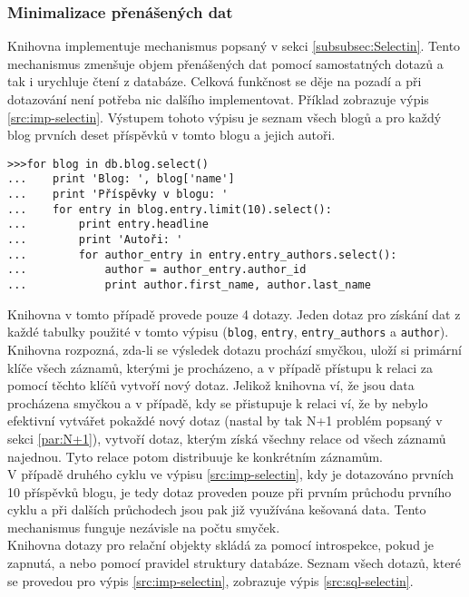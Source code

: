 \documentclass[ing,male,java,dept456]{diploma}						%
\begin{document}
\subsubsection{Minimalizace přenášených dat}

Knihovna implementuje mechanismus popsaný v sekci \ref{subsubsec:Selectin}. Tento mechanismus zmenšuje objem přenášených dat pomocí samostatných dotazů a tak i urychluje čtení z databáze. Celková funkčnost se děje na pozadí a při dotazování není potřeba nic dalšího implementovat. Příklad zobrazuje výpis \ref{src:imp-selectin}. Výstupem tohoto výpisu je seznam všech blogů a pro každý blog prvních deset příspěvků v tomto blogu a jejich autoři.

\begin{lstlisting}[style=custompython, label=src:imp-selectin, caption={Implementace samostatných dotazů v pypg}]
>>>for blog in db.blog.select()
...    print 'Blog: ', blog['name']
...    print 'Příspěvky v blogu: '
...    for entry in blog.entry.limit(10).select():
...        print entry.headline
...        print 'Autoři: '
...        for author_entry in entry.entry_authors.select():
...            author = author_entry.author_id
...            print author.first_name, author.last_name
\end{lstlisting}

Knihovna v tomto případě provede pouze 4 dotazy. Jeden dotaz pro získání dat z každé tabulky použité v tomto výpisu (\lstinline[style=inlinepython]|blog|, \lstinline[style=inlinepython]|entry|, \lstinline[style=inlinepython]|entry_authors| a \lstinline[style=inlinepython]|author|). \\
Knihovna rozpozná, zda-li se výsledek dotazu prochází smyčkou, uloží si primární klíče všech záznamů, kterými je procházeno, a v případě přístupu k relaci za pomocí těchto klíčů vytvoří nový dotaz. Jelikož knihovna ví, že jsou data procházena smyčkou a v případě, kdy se přistupuje k relaci ví, že by nebylo efektivní vytvářet pokaždé nový dotaz (nastal by tak N+1 problém popsaný v sekci \ref{par:N+1}), vytvoří dotaz, kterým získá všechny relace od všech záznamů najednou. Tyto relace potom distribuuje ke konkrétním záznamům. \\
V případě druhého cyklu ve výpisu \ref{src:imp-selectin}, kdy je dotazováno prvních 10 příspěvků blogu, je tedy dotaz proveden pouze při prvním průchodu prvního cyklu a při dalších průchodech jsou pak již využívána kešovaná data. Tento mechanismus funguje nezávisle na počtu smyček. \\
Knihovna dotazy pro relační objekty skládá za pomocí introspekce, pokud je zapnutá, a nebo pomocí pravidel struktury databáze. Seznam všech dotazů, které se provedou pro výpis \ref{src:imp-selectin}, zobrazuje výpis \ref{src:sql-selectin}.
\end{document}
